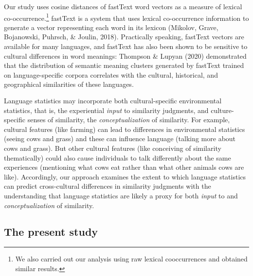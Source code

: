 \documentclass[10pt, letterpaper]{article}
\begin{document}
Our study uses cosine distances of fastText word vectors as a measure of
lexical co-occurrence.\footnote{We also carried out our analysis using
  raw lexical cooccurrences and obtained similar results.} fastText is a
system that uses lexical co-occurrence information to generate a vector
representing each word in its lexicon (Mikolov, Grave, Bojanowski,
Puhrsch, \& Joulin, 2018). Practically speaking, fastText vectors are
available for many languages, and fastText has also been shown to be
sensitive to cultural differences in word meanings: Thompson \& Lupyan
(2020) demonstrated that the distribution of semantic meaning clusters
generated by fastText trained on language-specific corpora correlates
with the cultural, historical, and geographical similarities of these
languages.

Language statistics may incorporate both cultural-specific environmental
statistics, that is, the experiential \emph{input} to similarity
judgments, and culture-specific senses of similarity, the
\emph{conceptualization} of similarity. For example, cultural features
(like farming) can lead to differences in environmental statistics
(seeing cows and grass) and these can influence language (talking more
about cows and grass). But other cultural features (like conceiving of
similarity thematically) could also cause individuals to talk
differently about the same experiences (mentioning what cows eat rather
than what other animals cows are like). Accordingly, our approach
examines the extent to which language statistics can predict
cross-cultural differences in similarity judgments with the
understanding that language statistics are likely a proxy for both
\emph{input} to and \emph{conceptualization} of similarity.

\hypertarget{the-present-study}{%
\subsection{The present study}\label{the-present-study}}
\end{document}
